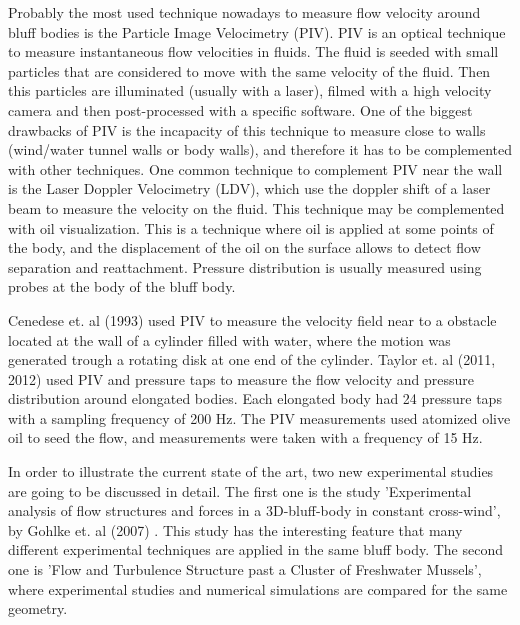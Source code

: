 \documentclass[journal]{new-aiaa}
\begin{document}
Probably the most used technique nowadays to measure flow velocity around bluff bodies is the Particle Image Velocimetry (PIV). PIV is an optical technique to measure instantaneous flow velocities in fluids. The fluid is seeded with small particles that are considered to move with the same velocity of the fluid. Then this particles are illuminated (usually with a laser), filmed with a high velocity camera and then post-processed with a specific software. One of the biggest drawbacks of PIV is the incapacity of this technique to measure close to walls (wind/water tunnel walls or body walls), and therefore it has to be complemented with other techniques. One common technique to complement PIV near the wall is the Laser Doppler Velocimetry (LDV), which use the doppler shift of a laser beam to measure the velocity on the fluid. This technique may be complemented with oil visualization. This is a technique where oil is applied at some points of the body, and the displacement of the oil on the surface allows to detect flow separation and reattachment. Pressure distribution is usually measured using probes at the body of the bluff body.      

Cenedese et. al (1993) \cite{Cenedese1993} used PIV to measure the velocity field near to a obstacle located at the wall of a cylinder filled with water, where the motion was generated trough a rotating disk at one end of the cylinder. Taylor et. al (2011, 2012) \cite{Taylor2011} \cite{Taylor2012} used PIV and pressure taps to measure the flow velocity and pressure distribution around elongated bodies. Each elongated body had 24 pressure taps with a sampling frequency of 200 Hz. The PIV measurements used atomized olive oil  to seed the flow, and measurements were taken with a frequency of 15 Hz.

In order to illustrate the current state of the art, two new experimental studies are going to be discussed in detail. The first one is the study 'Experimental analysis of flow structures and forces in a 3D-bluff-body in constant cross-wind', by Gohlke et. al (2007) \cite{Gohlke2007}. This study has the interesting feature that many different experimental techniques are applied in the same bluff body. The second one is 'Flow and Turbulence Structure past a Cluster of Freshwater Mussels', where experimental studies and numerical simulations are compared for the same geometry.
\end{document}
